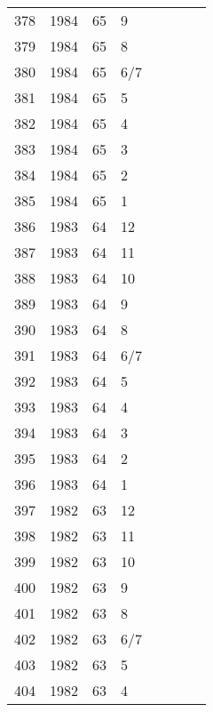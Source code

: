 \begin{longtable}{ |l|l|l|l|l|l|l|l| }
378 & 1984 & 65 &     9 &         &                &  & \\
379 & 1984 & 65 &     8 &         &                &  & \\
380 & 1984 & 65 &   6/7 &         &                &  & \\
381 & 1984 & 65 &     5 &         &                &  & \\
382 & 1984 & 65 &     4 &         &                &  & \\
383 & 1984 & 65 &     3 &         &                &  & \\
384 & 1984 & 65 &     2 &         &                &  & \\
385 & 1984 & 65 &     1 &         &                &  & \\
386 & 1983 & 64 &    12 &         &                &  & \\
387 & 1983 & 64 &    11 &         &                &  & \\
388 & 1983 & 64 &    10 &         &                &  & \\
389 & 1983 & 64 &     9 &         &                &  & \\
390 & 1983 & 64 &     8 &         &                &  & \\
391 & 1983 & 64 &   6/7 &         &                &  & \\
392 & 1983 & 64 &     5 &         &                &  & \\
393 & 1983 & 64 &     4 &         &                &  & \\
394 & 1983 & 64 &     3 &         &                &  & \\
395 & 1983 & 64 &     2 &         &                &  & \\
396 & 1983 & 64 &     1 &         &                &  & \\
397 & 1982 & 63 &    12 &         &                &  & \\
398 & 1982 & 63 &    11 &         &                &  & \\
399 & 1982 & 63 &    10 &         &                &  & \\
400 & 1982 & 63 &     9 &         &                &  & \\
401 & 1982 & 63 &     8 &         &                &  & \\
402 & 1982 & 63 &   6/7 &         &                &  & \\
403 & 1982 & 63 &     5 &         &                &  & \\
404 & 1982 & 63 &     4 &         &                &  & \\

\end{longtable}
